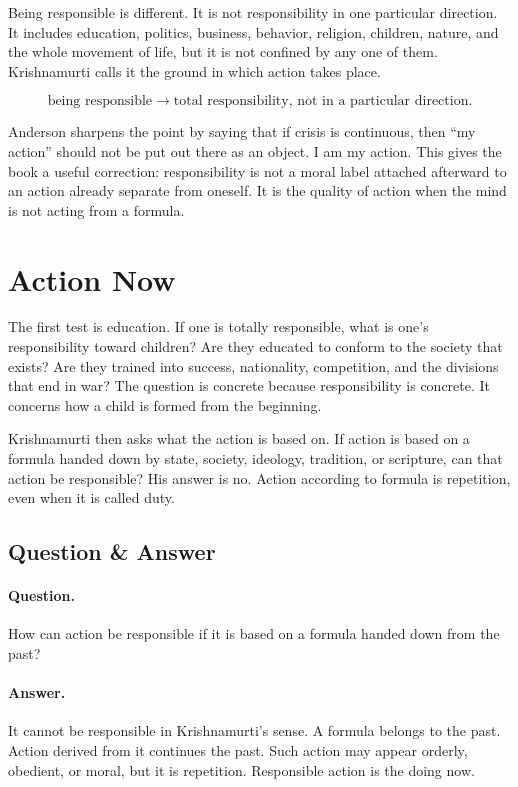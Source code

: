 \documentclass[11pt,oneside]{book}
\begin{document}
Being responsible is different. It is not responsibility in one particular direction. It includes education, politics, business, behavior, religion, children, nature, and the whole movement of life, but it is not confined by any one of them. Krishnamurti calls it the ground in which action takes place.

\begin{equation}
\text{being responsible}
\longrightarrow
\text{total responsibility, not in a particular direction}.
\end{equation}

Anderson sharpens the point by saying that if crisis is continuous, then ``my action'' should not be put out there as an object. I am my action. This gives the book a useful correction: responsibility is not a moral label attached afterward to an action already separate from oneself. It is the quality of action when the mind is not acting from a formula.

\section{Action Now}

The first test is education. If one is totally responsible, what is one's responsibility toward children? Are they educated to conform to the society that exists? Are they trained into success, nationality, competition, and the divisions that end in war? The question is concrete because responsibility is concrete. It concerns how a child is formed from the beginning.

Krishnamurti then asks what the action is based on. If action is based on a formula handed down by state, society, ideology, tradition, or scripture, can that action be responsible? His answer is no. Action according to formula is repetition, even when it is called duty.

\subsection{Question \& Answer}

\paragraph{Question.}
How can action be responsible if it is based on a formula handed down from the past?

\paragraph{Answer.}
It cannot be responsible in Krishnamurti's sense. A formula belongs to the past. Action derived from it continues the past. Such action may appear orderly, obedient, or moral, but it is repetition. Responsible action is the doing now.
\end{document}
